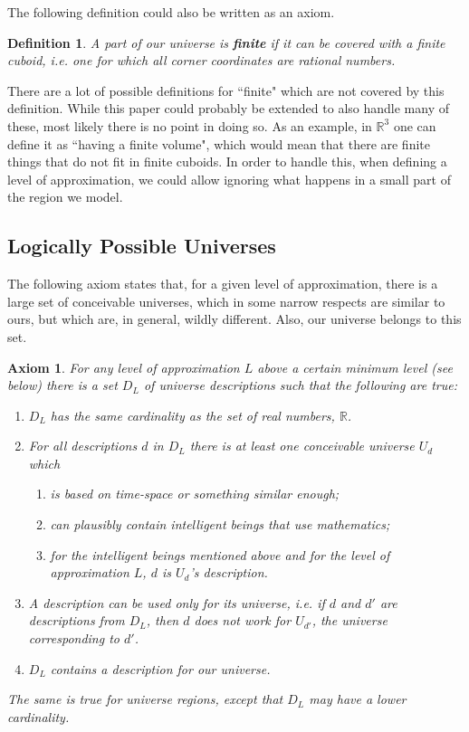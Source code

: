 \documentclass[a4paper
,draft
]{article}
\def\reale{\mathbb{R}}
\def\descriptions{D_L}
\newcommand{\definitie}[1]{\textbf{#1}}
\newcommand{\ghilimele}[1]{``#1"}
\newtheorem{definition}{Definition}
\newtheorem{axiom}{Axiom}
\begin{document}
The following definition could also be written as an axiom.

\begin{definition}\label{finitecuboid}
  A part of our universe is \definitie{finite} if
  it can be covered with a finite cuboid, i.e. one
  for which all corner coordinates are rational numbers.
\end{definition}

There are a lot of possible definitions for \ghilimele{finite} which are not
covered by this definition.
While this paper could probably be extended to also handle many of these,
most likely there is no point in doing so.
As an example, in $\reale^3$ one can define it as
\ghilimele{having a finite volume}, which would
mean that there are finite things that do not fit in finite cuboids.
In order to handle this, when defining a level of approximation,
we could allow ignoring what happens in a small part of the region we model.

\subsection{Logically Possible Universes}

The following axiom states that, for a given level of approximation,
there is a large set of conceivable universes, which in some narrow respects
are similar to ours, but which are, in general, wildly different.
Also, our universe belongs to this set.

\begin{axiom}\label{ax:uncountable}
  For any level of approximation $L$ above a certain minimum level (see below)
  there is a set $\descriptions$
  of universe descriptions such that the following are true:
  \begin{enumerate}
    \item $\descriptions$ has the same cardinality as
          the set of real numbers, $\reale$.
    \item For all descriptions $d$ in $\descriptions$
          there is at least one conceivable
          universe $U_d$ which
      \begin{enumerate}
        \item is based on time-space or something similar enough;
        \item can plausibly contain intelligent beings that use mathematics;
        \item for the intelligent beings mentioned above and
              for the level of approximation $L$,
              $d$ is $U_d$'s description.
      \end{enumerate}
    \item A description can be used only for its universe, i.e.
          if $d$ and $d'$ are descriptions from $\descriptions$,
          then $d$ does not work
          for $U_{d'}$, the universe corresponding to $d'$.
    \item $\descriptions$ contains a description for our universe.
  \end{enumerate}
  The same is true for universe regions, except that
  $\descriptions$ may have a lower
  cardinality.
\end{axiom}
\end{document}
